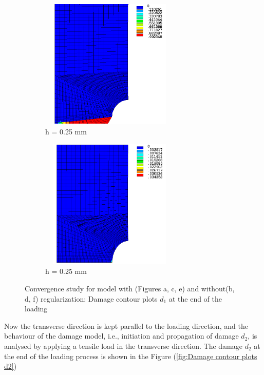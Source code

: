 \documentclass[12pt,a4paper,twoside,openright]{report}
\begin{document}
\begin{figure}[htbp!]\ContinuedFloat
     \begin{subfigure}{0.4\textwidth}
         \includegraphics[width=6.6cm,height=6.2cm]{25.d1-0.25-r.png}
         \caption{h = 0.25 mm}
         \label{fig:d1-0.25-r}
     \end{subfigure}
     \hspace{1.8cm}
     \begin{subfigure}{0.4\textwidth}
         \includegraphics[width=6.6cm,height=6.2cm]{25.d1-0.25-nr.png}
         \caption{h = 0.25 mm}
         \label{fig:d1-0.25-nr}
     \end{subfigure}     
        \caption{Convergence study for model with (Figures a, c, e) and without(b, d, f) regularization: Damage contour plots $d_{1}$ at the end of the loading}
        \label{fig:Convergence study for model with and without regularization}     
\end{figure}
\FloatBarrier
Now the transverse direction is kept parallel to the loading direction, and the behaviour of the damage model, i.e., initiation and propagation of damage $d_{2}$, is analysed by applying a tensile load in the transverse direction. The damage $d_{2}$ at the end of the loading process is shown in the Figure (\ref{fig:Damage contour plots d2})\\\\
\end{document}
